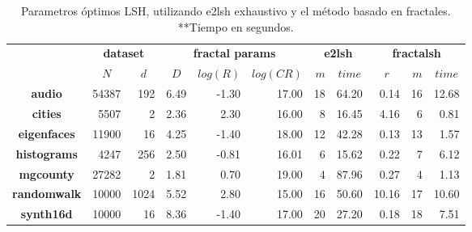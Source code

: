 \begin{table}[!t]
\caption{Parametros óptimos LSH, utilizando e2lsh exhaustivo y el método basado en fractales. **Tiempo en segundos. }
\label{table:lshparams}
\centering
\begin{footnotesize}
\begin{tabular}{c|r|r|r|r|r|r|r|r|r|r|}
    \cline{2-11}
    & \multicolumn{ 2}{|c|}{{\bf dataset}} & \multicolumn{ 3}{|c|}{{\bf fractal params}} & \multicolumn{ 2}{|c|}{{\bf e2lsh}} & \multicolumn{ 3}{|c|}{{\bf fractalsh}}  \\
    \cline{2-11}
    & \multicolumn{1}{c|}{$N$}    & \multicolumn{1}{c|}{$d$} & \multicolumn{1}{c|}{$D$}    & $log(R)$ & $log(CR)$   & $m$ & \multicolumn{1}{c|}{$time$}    & \multicolumn{1}{c|}{$r$}  & $m$ & \multicolumn{1}{c|}{$time$} \\
    \hline
\multicolumn{1}{|c|}{\bf audio}                 & 54387                 & 192      & 6.49     & -1.30      & 17.00       & 18                        & 64.20     & 0.14  & 16                    & 12.68                   \\
\multicolumn{1}{|c|}{\bf cities}                & 5507                  & 2        & 2.36     & 2.30       & 16.00       & 8                         & 16.45      & 4.16  & 6                     & 0.81                    \\
\multicolumn{1}{|c|}{\bf eigenfaces}            & 11900                 & 16       & 4.25     & -1.40      & 18.00       & 12                        & 42.28      & 0.13  & 13                    & 1.57                    \\
\multicolumn{1}{|c|}{\bf histograms}            & 4247                  & 256      & 2.50     & -0.81      & 16.01       & 6                         & 15.62      & 0.22  & 7                     & 6.12                    \\
\multicolumn{1}{|c|}{\bf mgcounty}              & 27282                 & 2        & 1.81     & 0.70       & 19.00       & 4                         & 87.96      & 0.27  & 4                     & 1.13                     \\
\multicolumn{1}{|c|}{\bf randomwalk}            & 10000                 & 1024     & 5.52     & 2.80       & 15.00       & 16                        & 50.60     & 10.16 & 17                    & 10.60                   \\
\multicolumn{1}{|c|}{\bf synth16d}              & 10000                 & 16       & 8.36     & -1.40      & 17.00       & 20                        & 27.20     & 0.18  & 18                    & 7.51                   \\

\end{tabular}
\end{footnotesize}
\end{table}
